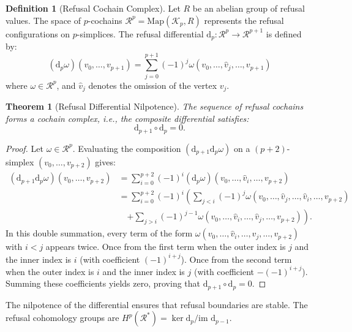 \documentclass[11pt,oneside]{book}
\theoremstyle{definition}
\newtheorem{definition}{Definition}[chapter]
\theoremstyle{plain}
\newtheorem{theorem}{Theorem}[chapter]
\theoremstyle{remark}
\begin{document}
\begin{definition}[Refusal Cochain Complex]\label{def:refusal_complex}
Let $R$ be an abelian group of refusal values. %
The space of $p$-cochains $\mathcal{R}^p = \text{Map}(\mathcal{K}_p, R)$ represents the refusal configurations on $p$-simplices. %
The refusal differential $\mathrm{d}_p: \mathcal{R}^p \to \mathcal{R}^{p+1}$ is defined by:
\[
(\mathrm{d}_p \omega)(v_0, \dots, v_{p+1}) = \sum_{j=0}^{p+1} (-1)^j \omega(v_0, \dots, \widehat{v}_j, \dots, v_{p+1})
\]
where $\omega \in \mathcal{R}^p$, and $\widehat{v}_j$ denotes the omission of the vertex $v_j$. %
\end{definition}

\begin{theorem}[Refusal Differential Nilpotence]\label{thm:differential_nilpotence}
The sequence of refusal cochains forms a cochain complex, i.e., the composite differential satisfies:
\[
\mathrm{d}_{p+1} \circ \mathrm{d}_p = 0.
\]
\end{theorem}

\begin{proof}
Let $\omega \in \mathcal{R}^p$. %
Evaluating the composition $(\mathrm{d}_{p+1} \mathrm{d}_p \omega)$ on a $(p+2)$-simplex $(v_0, \dots, v_{p+2})$ gives:
\[
\begin{aligned}
(\mathrm{d}_{p+1} \mathrm{d}_p \omega)(v_0, \dots, v_{p+2}) &= \sum_{i=0}^{p+2} (-1)^i (\mathrm{d}_p \omega)(v_0, \dots, \widehat{v}_i, \dots, v_{p+2}) \\
&= \sum_{i=0}^{p+2} (-1)^i \left( \sum_{j < i} (-1)^j \omega(v_0, \dots, \widehat{v}_j, \dots, \widehat{v}_i, \dots, v_{p+2}) \right. \\
&\quad \left. + \sum_{j > i} (-1)^{j-1} \omega(v_0, \dots, \widehat{v}_i, \dots, \widehat{v}_j, \dots, v_{p+2}) \right).
\end{aligned}
\]
In this double summation, every term of the form $\omega(v_0, \dots, \widehat{v}_i, \dots, \widehat{v}_j, \dots, v_{p+2})$ with $i < j$ appears twice. %
Once from the first term when the outer index is $j$ and the inner index is $i$ (with coefficient $(-1)^{i+j}$). %
Once from the second term when the outer index is $i$ and the inner index is $j$ (with coefficient $-(-1)^{i+j}$). %
Summing these coefficients yields zero, proving that $\mathrm{d}_{p+1} \circ \mathrm{d}_p = 0$. %
\end{proof}

The nilpotence of the differential ensures that refusal boundaries are stable. %
The refusal cohomology groups are $H^p(\mathcal{R}^*) = \ker \mathrm{d}_p / \text{im } \mathrm{d}_{p-1}$. %
\end{document}
